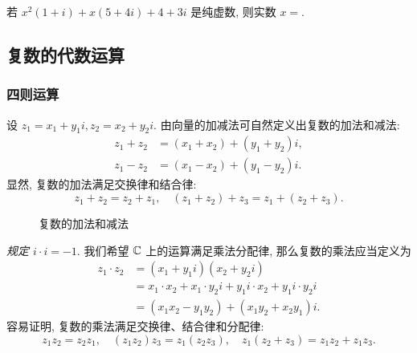 \begin{exercise}
  若 $x^2(1+i)+x(5+4i)+4+3i$ 是纯虚数, 则实数 $x=$\fillblank{}.
\end{exercise}


\subsection{复数的代数运算}


\subsubsection{四则运算}
设 $z_1=x_1+y_1i,z_2=x_2+y_2i$.
由向量的加减法可自然定义出复数的加法和减法:
  \begin{align*}
    z_1+z_2&=(x_1+x_2)+(y_1+y_2)i,\\
    z_1-z_2&=(x_1-x_2)+(y_1-y_2)i.
  \end{align*}
显然, 复数的加法满足交换律和结合律:
\[z_1+z_2=z_2+z_1,\quad (z_1+z_2)+z_3=z_1+(z_2+z_3).\]

\begin{figure}[!h]
  \centering
  \caption{复数的加法和减法}
\end{figure}

\emph{规定 $i\cdot i=-1$}.
我们希望 ${\mathbb{C}}$ 上的运算满足乘法分配律, 那么复数的乘法应当定义为
  \begin{align*}
    z_1\cdot z_2&=(x_1+y_1i)(x_2+y_2i)\\
    &=x_1\cdot x_2+x_1\cdot y_2i+y_1i\cdot x_2+y_1i\cdot y_2i\\
    &=(x_1x_2-y_1y_2)+(x_1y_2+x_2y_1)i.
  \end{align*}
容易证明, 复数的乘法满足交换律、结合律和分配律:
\[z_1z_2=z_2z_1,\quad (z_1z_2) z_3=z_1(z_2 z_3),\quad z_1(z_2+z_3)=z_1z_2+z_1z_3.\]

